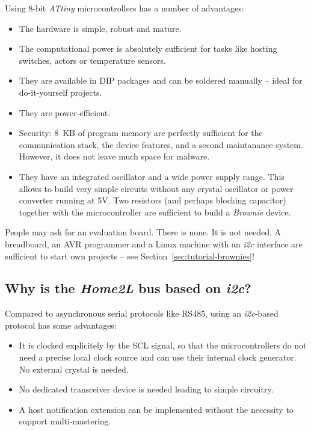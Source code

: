\documentclass[12pt,english,parskip=half,headheight=19pt]{scrreprt}
\begin{document}
Using 8-bit \textit{ATtiny} microcontrollers has a number of advantages:
\begin{itemize}
  \item The hardware is simple, robust and mature.
  \item The computational power is absolutely sufficient for tasks like hosting switches,
        actors or temperature sensors.
  \item They are available in DIP packages and can be soldered manually -- ideal for do-it-yourself
        projects.
  \item They are power-efficient.
  \item Security: 8~KB of program memory are perfectly sufficient for the communication stack,
        the device features, and a second maintanance system. However, it does not leave much space
        for malware.
  \item They have an integrated oscillator and a wide power supply range. This allows to build
        very simple circuits without any crystal oscillator or power converter running at 5V.
        Two resistors (and perhaps blocking capacitor) together with the microcontroller are
        sufficient to build a \textit{Brownie} device.
\end{itemize}

People may ask for an evaluation board. There is none. It is not needed. A breadboard, an AVR programmer and a Linux machine with an \textit{i2c} interface are sufficient to start own projects -- see Section~\ref{sec:tutorial-brownies}!



\subsection*{Why is the \textit{Home2L} bus based on \textit{i2c}?}

Compared to asynchronous serial protocols like RS485, using an \textit{i2c}-based protocol has some advantages:
\begin{itemize}
  \item It is clocked explicitely by the SCL signal, so that the microcontrollers do not need a precise
        local clock source and can use their internal clock generator. No external crystal is needed.
  \item No dedicated transceiver device is needed leading to simple circuitry.
  \item A host notification extension can be implemented without the necessity to support
        multi-mastering.
\end{itemize}
\end{document}
